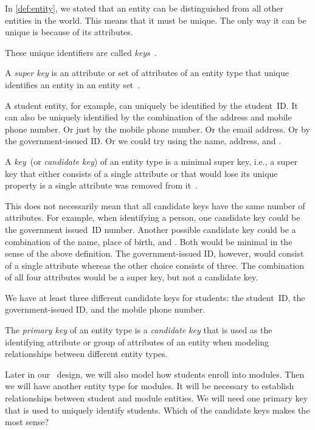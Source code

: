%
\label{sec:conceptualKeys}%
%
In \cref{def:entity}, we stated that an entity can be distinguished from all other entities in the world.
This means that it must be unique.
The only way it can be unique is because of its attributes.

These unique identifiers are called \emph{keys}~\cite{S2024D:CDMERDE}.%
%
\begin{definition}%
\label{def:superKey}%
A \emph{super key} is an attribute or set of attributes of an entity type that unique identifies an entity in an entity set~\cite{S2024D:CDMERDE,G2011EW2ITDS:CMUTERM}.%
\end{definition}%
%
A student entity, for example, can uniquely be identified by the student~ID.
It can also be uniquely identified by the combination of the address and mobile phone number.
Or just by the mobile phone number.
Or the email address.
Or by the government-issued ID.
Or we could try using the name, address, and .%
%
\begin{definition}%
\label{def:key}%
A \emph{key}~(or \emph{candidate key}) of an entity type is a minimal super key, i.e., a super key that either consists of a single attribute or that would lose its unique property is a single attribute was removed from it~\cite{S2024D:CDMERDE,G2011EW2ITDS:CMUTERM,SS2005EIDDDFDB:SDLDUTRDM}.%
\end{definition}%
%
This does not necessarily mean that all candidate keys have the same number of attributes.
For example, when identifying a person, one candidate key could be the government issued~ID number.
Another possible candidate key could be a combination of the name, place of birth, and .
Both would be minimal in the sense of the above definition.
The government-issued ID, however, would consist of a single attribute whereas the other choice consists of three.
The combination of all four attributes would be a super key, but not a candidate key.

We have at least three different candidate keys for students:
the student~ID, the government-issued ID, and the mobile phone number.%
%
\begin{definition}%
\label{def:primaryKey}%
The \emph{primary key} of an entity type is a \emph{candidate key} that is used as the identifying attribute or group of attributes of an entity when modeling relationships between different entity types.%
\end{definition}%
%
Later in our \db\ design, we will also model how students enroll into modules.
Then we will have another entity type for modules.
It will be necessary to establish relationships between student and module entities.
We will need one primary key that is used to uniquely identify students.
Which of the candidate keys makes the most sense?

